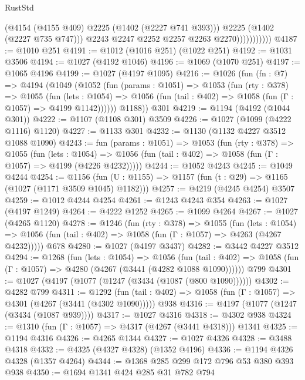 \begin{lexlean}{RustStd}
\begin{coremodule}
                            (@4154 (@4155 @409) @2225 (@1402 (@2227 @741 @393)))
                            @2225
                            (@1402 (@2227 @735 @747)))
                          @2243
                          @2247
                          @2252
                          @2257
                          @2263
                          @2270)))))))))))
@4187 := @1010 @251
@4191 := @1012 (@1016 @251) (@1022 @251)
@4192 := @1031 @3506
@4194 := @1027 (@4192 @1046)
@4196 := @1069 (@1070 @251)
@4197 := @1065 @4196
@4199 := @1027 (@4197 @1095)
@4216 := @1026
    (fun (fn : @7) =>
    @4194
      (@1049
        (@1052
          (fun (params : @1051) =>
          @1053
            (fun (rty : @378) =>
            @1055
              (fun (lets : @1054) =>
              @1056 (fun (tail : @402) => @1058 (fun (Γ : @1057) => @4199 @1142))))))
        @1188))
    @301
@4219 := @1194 (@4192 (@1044 @301))
@4222 := @1107 (@1108 @301) @3509
@4226 := @1027 (@1099 (@4222 @1116) @1120)
@4227 := @1133 @301
@4232 := @1130 (@1132 @4227 @3512 @1088 @1090)
@4243 := fun (params : @1051) =>
  @1053
    (fun (rty : @378) =>
    @1055
      (fun (lets : @1054) =>
      @1056 (fun (tail : @402) => @1058 (fun (Γ : @1057) => @4199 (@4226 @4232)))))
@4244 := @1052 @4243
@4245 := @1049 @4244
@4254 := @1156 (fun (U : @1155) => @1157 (fun (t : @29) => @1165 (@1027 (@1171 @3509 @1045) @1182)))
@4257 := @4219 (@4245 @4254) @3507
@4259 := @1012 @4244 @4254
@4261 := @1243 @4243 @354
@4263 := @1027 (@4197 @1249)
@4264 := @4222 @1252
@4265 := @1099 @4264
@4267 := @1027 (@4265 @1120)
@4278 := @1246
    (fun (rty : @378) =>
    @1055
      (fun (lets : @1054) =>
      @1056 (fun (tail : @402) => @1058 (fun (Γ : @1057) => @4263 (@4267 @4232)))))
    @678
@4280 := @1027 (@4197 @3437)
@4282 := @3442 @4227 @3512
@4294 := @1268
    (fun (lets : @1054) =>
    @1056
      (fun (tail : @402) => @1058 (fun (Γ : @1057) => @4280 (@4267 (@3441 (@4282 @1088 @1090))))))
    @799
@4301 := @1027 (@4197 (@1077 (@1247 (@3434 (@1087 (@800 @1090))))))
@4302 := @4282 @799
@4311 := @1292
    (fun (tail : @402) => @1058 (fun (Γ : @1057) => @4301 (@4267 (@3441 (@4302 @1090)))))
    @938
@4316 := @4197 (@1077 (@1247 (@3434 (@1087 @939))))
@4317 := @1027 @4316
@4318 := @4302 @938
@4324 := @1310 (fun (Γ : @1057) => @4317 (@4267 (@3441 @4318))) @1341
@4325 := @1194 @4316
@4326 := @4265 @1344
@4327 := @1027 @4326
@4328 := @3488 @4318
@4332 := @4325 (@4327 @4328) (@1352 @4196)
@4336 := @1194 @4326 @4328 (@1357 @4264)
@4344 := @1368 @285 @299 @172 @796 @53 @380 @393 @938
@4350 := @1694 @1341 @424 @285 @31 @782 @794

\end{coremodule}
\end{lexlean}
